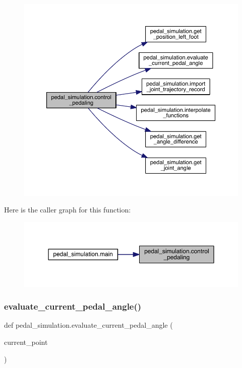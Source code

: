 \begin{figure}[H]
\begin{center}
\leavevmode
\includegraphics[width=350pt]{namespacepedal__simulation_a3d0512a0cf73f1c663d92c5b63695d64_cgraph}
\end{center}
\end{figure}
Here is the caller graph for this function\+:\nopagebreak
\begin{figure}[H]
\begin{center}
\leavevmode
\includegraphics[width=350pt]{namespacepedal__simulation_a3d0512a0cf73f1c663d92c5b63695d64_icgraph}
\end{center}
\end{figure}
\mbox{\label{namespacepedal__simulation_aa15b4ab22216ca131bc54f6675a862e7}} 
\subsubsection{\texorpdfstring{evaluate\_current\_pedal\_angle()}{evaluate\_current\_pedal\_angle()}}
{\footnotesize\ttfamily def pedal\+\_\+simulation.\+evaluate\+\_\+current\+\_\+pedal\+\_\+angle (\begin{DoxyParamCaption}\item[{}]{current\+\_\+point }\end{DoxyParamCaption})}



